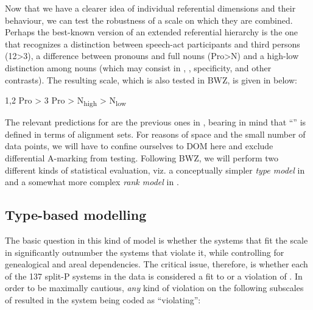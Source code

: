 \documentclass[output=paper]{langscibook}
\begin{document}
Now that we have a clearer idea of individual referential dimensions and their behaviour, we can test the robustness of a scale on which they are combined. Perhaps the best-known version of an extended referential hierarchy is the one that recognizes a distinction between speech-act participants and third persons (12>3), a difference between pronouns and full nouns (Pro>N) and a high-low distinction among nouns (which may consist in , , specificity,  and other contrasts). The resulting scale, which is also tested in BWZ, is given in  below:

\ea
\label{18-sc-ex:3}
1,2 Pro > 3 Pro > N\textsubscript{high} > N\textsubscript{low}\\
\z

The relevant predictions for  are the previous ones in , bearing in mind that “” is defined in terms of alignment sets. For reasons of space and the small number of data points, we will have to confine ourselves to DOM here and exclude differential A-marking from testing. Following BWZ, we will perform two different kinds of statistical evaluation, viz. a conceptually simpler \textit{type model} in  and a somewhat more complex \textit{rank model} in .

\subsection{Type-based modelling}
\label{18-sc-subsec:3-1}

The basic question in this kind of model is whether the systems that fit the scale in  significantly outnumber the systems that violate it, while controlling for genealogical and areal dependencies. The critical issue, therefore, is whether each of the 137 split-P systems in the data is considered a fit to or a violation of . In order to be maximally cautious, \textit{any} kind of violation on the following subscales of  resulted in the system being coded as “violating”:
\end{document}
